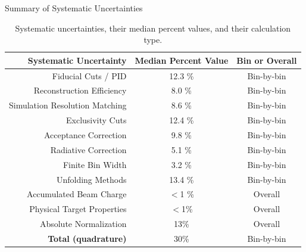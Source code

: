 \documentclass[aspectratio=169]{beamer}
\begin{document}
\begin{frame}{Summary of Systematic Uncertainties}
    \begin{table}[H]
        \centering
        \begin{tabular}{rcc}
        \hline
        Systematic Uncertainty & Median Percent Value & Bin or Overall \\ 
        \hline
            Fiducial Cuts / PID              & 12.3 \%    & Bin-by-bin   \\ 
            Reconstruction Efficiency       & 8.0 \%       & Bin-by-bin   \\ 
            Simulation Resolution Matching    & 8.6 \%       & Bin-by-bin   \\ 
            Exclusivity Cuts            & 12.4 \%      & Bin-by-bin   \\ 
            Acceptance Correction       & 9.8 \%       & Bin-by-bin   \\ 
            Radiative Correction        & 5.1 \%       & Bin-by-bin   \\ 
            Finite Bin Width            & 3.2 \%       & Bin-by-bin   \\
            Unfolding Methods            & 13.4 \%       & Bin-by-bin   \\ 
            Accumulated Beam Charge     & $<$1 \%        & Overall      \\ 
            Physical Target Properties  & $<$1\%    & Overall      \\
            Absolute Normalization      & 13\%       & Overall      \\ 
            \hline
            \textbf{Total (quadrature)}          & 30\%     & Bin-by-bin      \\ 
                \hline
        \end{tabular}
        \caption[Major Systematic Uncertainties]{Systematic uncertainties, their median percent values, and their calculation type.}
        \label{table:systematic_uncertainties}
    \end{table}

\end{frame}
\end{document}
